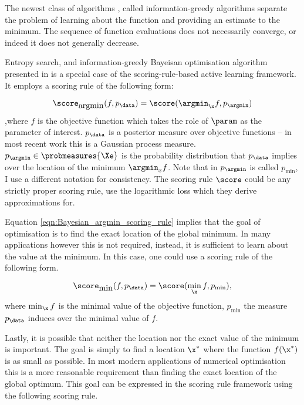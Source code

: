 The newest class of algorithms \citep{Hennig2012entropy}, called information-greedy algorithms separate the problem of learning about the function and providing an estimate to the minimum. The sequence of function evaluations does not necessarily converge, or indeed it does not generally decrease.

Entropy search, and information-greedy Bayeisan optimisation algorithm presented in \citep{Hennig2012entropy} is a special case of the scoring-rule-based active learning framework. It employs a scoring rule of the following form:

\begin{equation}
	\score_{\mbox{argmin}}(f,p_\data) = \score(\argmin_{\x}f,p_{\argmin}) \label{eqn:Bayesian_argmin_scoring_rule}
\end{equation}
,where $f$ is the objective function which takes the role of $\param$ as the parameter of interest. $p_\data$ is a posterior measure over objective functions -- in most recent work this is a Gaussian process measure. $p_{\argmin} \in \probmeasures{\Xe}$ is the probability distribution that $p_\data$ implies over the location of the minimum $\argmin_{x}f$. Note that in \citep{Hennig2012entropy} $p_{\argmin}$ is called $p_{\min}$, I use a different notation for consistency. The scoring rule $\score$ could be any strictly proper scoring rule, \citeauthor{Hennig2012entropy} use the logarithmic loss which they derive approximations for.

Equation \eqref{eqn:Bayesian_argmin_scoring_rule} implies that the goal of optimisation is to find the exact location of the global minimum. In many applications however this is not required, instead, it is sufficient to learn about the value at the minimum. In this case, one could use a scoring rule of the following form.

\begin{equation}
	\score_{\mbox{min}}(f,p_\data) = \score(\min_{\x}f,p_{\min}), \label{eqn:Bayesian_argmin_scoring_rule}
\end{equation}
where $\min_{\x}f$ is the minimal value of the objective function, $p_{\min}$ the measure $p_\data$ induces over the minimal value of $f$.

Lastly, it is possible that neither the location nor the exact value of the minimum is important. The goal is simply to find a location $\x^{*}$ where the function $f(\x^{*})$ is as small as possible. In most modern applications of numerical optimisation this is a more reasonable requirement than finding the exact location of the global optimum. This goal can be expressed in the scoring rule framework using the following scoring rule.


